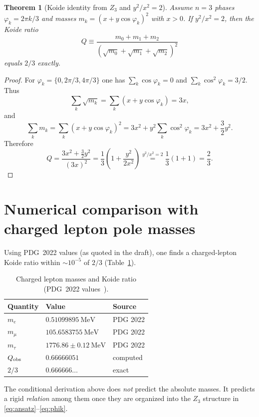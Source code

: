 \documentclass[12pt,a4paper]{article}
\newtheorem{theorem}{Theorem}
\begin{document}
\begin{theorem}[Koide identity from $Z_3$ and $y^2/x^2=2$]
\label{thm:koide}
Assume $n=3$ phases $\varphi_k=2\pi k/3$ and masses $m_k=(x+y\cos\varphi_k)^2$ with $x>0$.
If $y^2/x^2=2$, then the Koide ratio
\[
Q\equiv \frac{m_0+m_1+m_2}{\left(\sqrt{m_0}+\sqrt{m_1}+\sqrt{m_2}\right)^2}
\]
equals $2/3$ exactly.
\end{theorem}

\begin{proof}
For $\varphi_k=\{0,2\pi/3,4\pi/3\}$ one has $\sum_k \cos\varphi_k=0$ and $\sum_k \cos^2\varphi_k=3/2$.
Thus
\[
\sum_k \sqrt{m_k} = \sum_k (x+y\cos\varphi_k)=3x,
\]
and
\[
\sum_k m_k = \sum_k (x+y\cos\varphi_k)^2
= 3x^2 + y^2\sum_k \cos^2\varphi_k
= 3x^2 + \frac{3}{2}y^2.
\]
Therefore
\[
Q = \frac{3x^2+\frac{3}{2}y^2}{(3x)^2}
= \frac{1}{3}\left(1+\frac{y^2}{2x^2}\right)
\overset{y^2/x^2=2}{=} \frac{1}{3}(1+1)=\frac{2}{3}.
\]
\end{proof}

\section{Numerical comparison with charged lepton pole masses}
\label{sec:numerics}

Using PDG~2022 values (as quoted in the draft), one finds a charged-lepton Koide ratio within $\sim 10^{-5}$ of $2/3$ (Table~\ref{tab:pdg}).
\begin{table}[h]
\centering
\caption{Charged lepton masses and Koide ratio (PDG~2022 values~\cite{pdg2022}).}
\label{tab:pdg}
\begin{tabular}{@{}lll@{}}
\toprule
Quantity & Value & Source \\
\midrule
$m_e$ & $0.51099895\ \mathrm{MeV}$ & PDG 2022 \\
$m_\mu$ & $105.6583755\ \mathrm{MeV}$ & PDG 2022 \\
$m_\tau$ & $1776.86 \pm 0.12\ \mathrm{MeV}$ & PDG 2022 \\
\midrule
$Q_{\rm obs}$ & $0.66666051$ & computed \\
$2/3$ & $0.666666\ldots$ & exact \\
\bottomrule
\end{tabular}
\end{table}

\noindent
The conditional derivation above does \emph{not} predict the absolute masses.
It predicts a rigid \emph{relation} among them once they are organized into the $Z_3$ structure in \eqref{eq:ansatz}--\eqref{eq:phik}.
\end{document}

